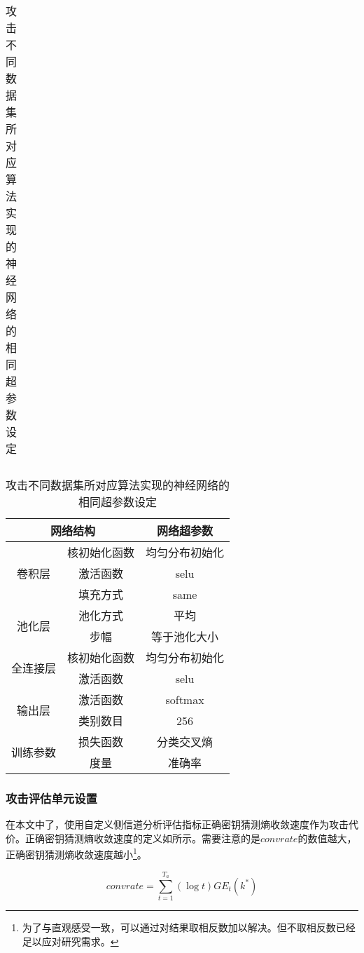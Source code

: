 {\begin{table}[!htb]
{\begin{subtable}[t]{\textwidth}
\begin{tabular}{cccccccc}
				\end{tabular}   
			\end{subtable}
		}
		
		\small{
			\begin{subtable}[t]{\textwidth}
				\caption{攻击不同数据集所对应算法实现的神经网络的相同超参数设定}
				\centering
				\begin{tabular}{ccc}
					\hline
					\multicolumn{2}{c}{网络结构} &网络超参数\\
					\hline
					\multirow{3}{*}{卷积层 }     &核初始化函数    &均匀分布初始化      \\
					                             &激活函数  &selu     \\
					                             &填充方式  &same     \\
					\multirow{2}{*}{池化层 }     &池化方式    &平均              \\
					                             &步幅  &等于池化大小     \\
					\multirow{2}{*}{全连接层}    &核初始化函数    &均匀分布初始化          \\
					                            &激活函数  &selu     \\
					\multirow{2}{*}{输出层}      &激活函数    &softmax          \\
					                             &类别数目    &256                  \\
					\multirow{2}{*}{训练参数}      &损失函数    &分类交叉熵          \\
				 	                               &度量       &准确率                  \\
					\hline
				\end{tabular}
			\end{subtable}
		}
	\end{table}
	\subsubsection{攻击评估单元设置}
	在本文中了，使用自定义侧信道分析评估指标正确密钥猜测熵收敛速度作为攻击代价。正确密钥猜测熵收敛速度的定义如所示。需要注意的是$convrate$的数值越大，正确密钥猜测熵收敛速度越小\footnote{为了与直观感受一致，可以通过对结果取相反数加以解决。但不取相反数已经足以应对研究需求。}。
	
	\begin{equation}\label{eq:mycost}
	convrate=\sum\limits_{t=1}^{T_a}(\log t)GE_t(k^*)
	\end{equation}
	
}
